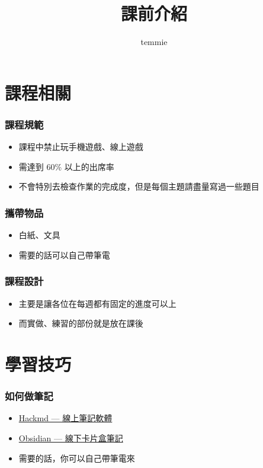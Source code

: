 \documentclass[mathserif]{beamer}
\title{課前介紹}
\author{temmie}
\date{}
\begin{document}
\begin{frame}
    \titlepage
\end{frame}

\begin{frame}
    \tableofcontents
\end{frame}

\section{課程相關}

\begin{frame}
    \frametitle{課程規範}
    \begin{itemize}
        \item 課程中禁止玩手機遊戲、線上遊戲
        \item 需達到 60\% 以上的出席率
        \item 不會特別去檢查作業的完成度，但是每個主題請盡量寫過一些題目
    \end{itemize}
\end{frame}

\begin{frame}
    \frametitle{攜帶物品}
    \begin{itemize}
        \item 白紙、文具
        \item 需要的話可以自己帶筆電
    \end{itemize}
\end{frame}

\begin{frame}
    \frametitle{課程設計}
    \begin{itemize}
        \item 主要是讓各位在每週都有固定的進度可以上
        \item 而實做、練習的部份就是放在課後
    \end{itemize}
\end{frame}

\section{學習技巧}

\begin{frame}
    \frametitle{如何做筆記}
    \begin{itemize}
        \item \href{https://hackmd.io/?nav=overview}{Hackmd — 線上筆記軟體}
        \item \href{https://youtu.be/Egj_DdGUIDI}{Obsidian — 線下卡片盒筆記}
        \vspace{0.5cm}
        \item 需要的話，你可以自己帶筆電來
    \end{itemize}
\end{frame}
\end{document}
